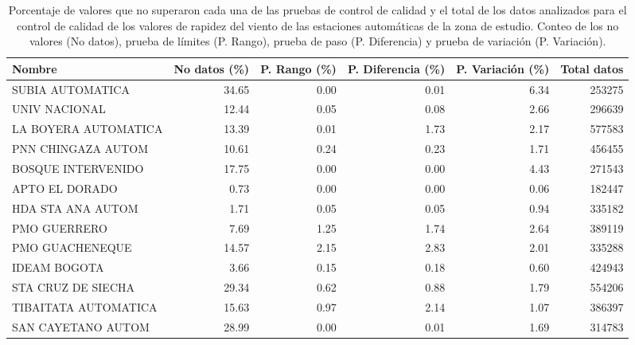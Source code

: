 \begin{table}[H]
\begin{center}

\caption{Porcentaje de valores que no superaron cada una de las pruebas de control de calidad y el total de los datos analizados para el control de calidad de los valores de rapidez del viento de las estaciones automáticas de la zona de estudio. Conteo de los no valores (No datos), prueba de límites (P. Rango), prueba de paso (P. Diferencia) y prueba de variación (P. Variación).}

\begin{tabular}{p{3cm}rrrrr}
\toprule
      Nombre &  No datos  (\%)&  P. Rango  (\%)&  P. Diferencia  (\%)&  P. Variación  (\%)& Total datos \\
\midrule
        SUBIA AUTOMATICA &      34.65 &      0.00 &           0.01 &          6.34 &        253275 \\
           UNIV NACIONAL &      12.44 &      0.05 &           0.08 &          2.66 &        296639 \\
    LA BOYERA AUTOMATICA &      13.39 &      0.01 &           1.73 &          2.17 &        577583 \\
      PNN CHINGAZA AUTOM &      10.61 &      0.24 &           0.23 &          1.71 &        456455 \\
      BOSQUE INTERVENIDO &      17.75 &      0.00 &           0.00 &          4.43 &        271543 \\
          APTO EL DORADO &       0.73 &      0.00 &           0.00 &          0.06 &        182447 \\
       HDA STA ANA AUTOM &       1.71 &      0.05 &           0.05 &          0.94 &        335182 \\
            PMO GUERRERO &       7.69 &      1.25 &           1.74 &          2.64 &        389119 \\
         PMO GUACHENEQUE &      14.57 &      2.15 &           2.83 &          2.01 &        335288 \\
            IDEAM BOGOTA &       3.66 &      0.15 &           0.18 &          0.60 &        424943 \\
      STA CRUZ DE SIECHA &      29.34 &      0.62 &           0.88 &          1.79 &        554206 \\
    TIBAITATA AUTOMATICA &      15.63 &      0.97 &           2.14 &          1.07 &        386397 \\
      SAN CAYETANO AUTOM &      28.99 &      0.00 &           0.01 &          1.69 &        314783 \\

\end{tabular}
\end{center}
\end{table}
